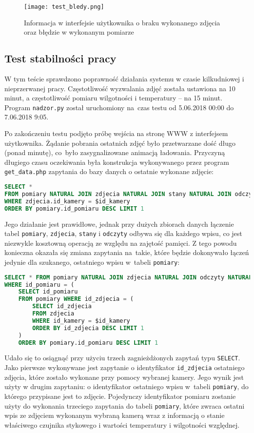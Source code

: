 \documentclass[a4paper,11pt,twoside]{article}
\begin{document}
\begin{figure}[H]
\begin{center}
\texttt{[image: test\_bledy.png]}
\caption{Informacja w interfejsie użytkownika o braku wykonanego zdjęcia oraz błędzie w wykonanym pomiarze}
\label{fig: test_bledy}
\end{center}
\end{figure}

\subsection{Test stabilności pracy}
W tym teście sprawdzono poprawność działania systemu w czasie kilkudniowej i nieprzerwanej pracy. Częstotliwość wyzwalania zdjęć została ustawiona na 10 minut, a częstotliwość pomiaru wilgotności i temperatury -- na 15 minut. Program \texttt{nadzor.py} został uruchomiony na~czas testu od 5.06.2018 00:00 do 7.06.2018 9:05.

Po zakończeniu testu podjęto próbę wejścia na stronę WWW z interfejsem użytkownika. Żądanie pobrania ostatnich zdjęć było przetwarzane dość długo (ponad minutę), co~było zasygnalizowane animacją ładowania. Przyczyną długiego czasu oczekiwania była konstrukcja wykonywanego przez program \texttt{get{\_}data.php} zapytania do bazy danych o ostatnie wykonane zdjęcie:
\begin{lstlisting}[language=SQL]
SELECT *
FROM pomiary NATURAL JOIN zdjecia NATURAL JOIN stany NATURAL JOIN odczyty
WHERE zdjecia.id_kamery = $id_kamery  
ORDER BY pomiary.id_pomiaru DESC LIMIT 1
\end{lstlisting}
Jego działanie jest prawidłowe, jednak przy dużych zbiorach danych łączenie tabel \texttt{pomiary}, \texttt{zdjecia}, \texttt{stany} i \texttt{odczyty} odbywa się dla każdego wpisu, co jest niezwykle kosztowną operacją ze względu na zajętość pamięci. Z tego powodu konieczna okazała się zmiana zapytania na~takie, które będzie dokonywało łączeń jedynie dla szukanego, ostatniego wpisu w~tabeli \texttt{pomiary}:
\begin{lstlisting}[language=SQL]
SELECT * FROM pomiary NATURAL JOIN zdjecia NATURAL JOIN odczyty NATURAL JOIN stany
WHERE id_pomiaru = (
	SELECT id_pomiaru 
	FROM pomiary WHERE id_zdjecia = (
		SELECT id_zdjecia 
		FROM zdjecia 
		WHERE id_kamery = $id_kamery 
		ORDER BY id_zdjecia DESC LIMIT 1
	)
	ORDER BY pomiary.id_pomiaru DESC LIMIT 1
\end{lstlisting}
Udało się to osiągnąć przy użyciu trzech zagnieżdżonych zapytań typu \texttt{SELECT}. Jako pierwsze wykonywane jest zapytanie o identyfikator \texttt{id{\_}zdjecia} ostatniego zdjęcia, które zostało wykonane przy pomocy wybranej kamery. Jego wynik jest użyty w drugim zapytaniu: o identyfikator ostatniego wpisu w~tabeli \texttt{pomiary}, do którego przypisane jest to zdjęcie. Pojedynczy identyfikator pomiaru zostanie użyty do wykonania trzeciego zapytania do tabeli \texttt{pomiary}, które zwraca ostatni wpis ze zdjęciem wykonanym wybraną kamerą wraz z informacją o stanie właściwego czujnika stykowego i wartości temperatury i wilgotności względnej. 
\end{document}

